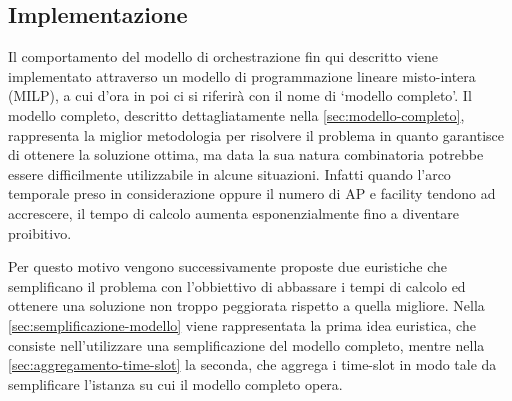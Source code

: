 %
%
\subsection{Implementazione}
\label{sub-sec:implementazione}

Il comportamento del modello di orchestrazione fin qui descritto viene implementato attraverso un modello di programmazione lineare misto-intera (MILP), a cui d'ora in poi ci si riferirà con il nome di `modello completo'. Il modello completo, descritto dettagliatamente nella \autoref{sec:modello-completo}, rappresenta la miglior metodologia per risolvere il problema in quanto garantisce di ottenere la soluzione ottima, ma data la sua natura combinatoria potrebbe essere difficilmente utilizzabile in alcune situazioni. Infatti quando l'arco temporale preso in considerazione oppure il numero di AP e facility tendono ad accrescere, il tempo di calcolo aumenta esponenzialmente fino a diventare proibitivo. 

Per questo motivo vengono successivamente proposte due euristiche che semplificano il problema con l'obbiettivo di abbassare i tempi di calcolo ed ottenere una soluzione non troppo peggiorata rispetto a quella migliore. Nella \autoref{sec:semplificazione-modello} viene rappresentata la prima idea euristica, che consiste nell'utilizzare una semplificazione del modello completo, mentre nella \autoref{sec:aggregamento-time-slot} la seconda, che aggrega i time-slot in modo tale da semplificare l'istanza su cui il modello completo opera.

